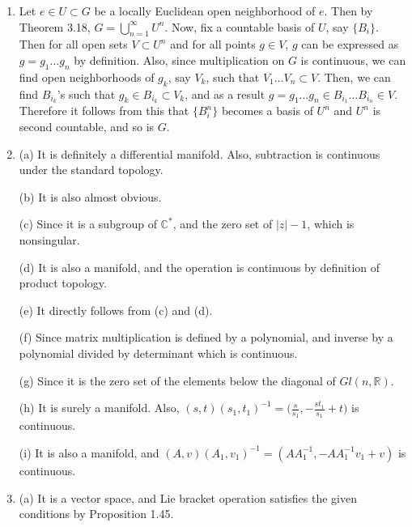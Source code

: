 \begin{enumerate}
\item Let $e \in U \subset G$ be a locally Euclidean open neighborhood of $e$. 
Then by Theorem 3.18, $G=\bigcup_{n=1}^{\infty} U^{n}$. 
Now, fix a countable basis of $U$, say $\{B_{i}\}$. 
Then for all open sets $V \subset U^{n}$ and for all points $g \in V$, 
$g$ can be expressed as $g=g_{1} \ldots g_{n}$ by definition. 
Also, since multiplication on $G$ is continuous, 
we can find open neighborhoods of $g_{k}$, 
say $V_{k}$, such that $V_{1} \ldots V_{n} \subset V$. 
Then, we can find $B_{i_{k}}$'s such that $g_{k} \in B_{i_{k}} \subset V_{k}$, 
and as a result $g=g_{1} \ldots g_{n} \in B_{i_{1}} \ldots B_{i_{n}} \in V$. 
Therefore it follows from this that $\{B_{i}^{n}\}$ becomes a basis of $U^{n}$ and $U^{n}$ is second countable, and so is $G$.
\item (a) It is definitely a differential manifold. 
Also, subtraction is continuous under the standard topology.

(b) It is also almost obvious.

(c) Since it is a subgroup of $\mathbb{C}^{*}$, and the zero set of $|z|-1$, which is nonsingular.

(d) It is also a manifold, and the operation is continuous by definition of product topology.

(e) It directly follows from (c) and (d).

(f) Since matrix multiplication is defined by a polynomial, 
and inverse by a polynomial divided by determinant which is continuous.

(g) Since it is the zero set of the elements below the diagonal of $Gl(n, \mathbb{R})$.

(h) It is surely a manifold. Also, $(s, t)(s_{1}, t_{1})^{-1}=\big(\frac{s}{s_{1}},-\frac{s t_{1}}{s_{1}}+t\big)$ is continuous.

(i) It is also a manifold, and $(A, v)(A_{1}, v_{1})^{-1}=(A A_{1}^{-1},-A A_{1}^{-1} v_{1}+v)$ is continuous.
\item (a) It is a vector space, and Lie bracket operation satisfies the given conditions by Proposition 1.45.


\end{enumerate}
